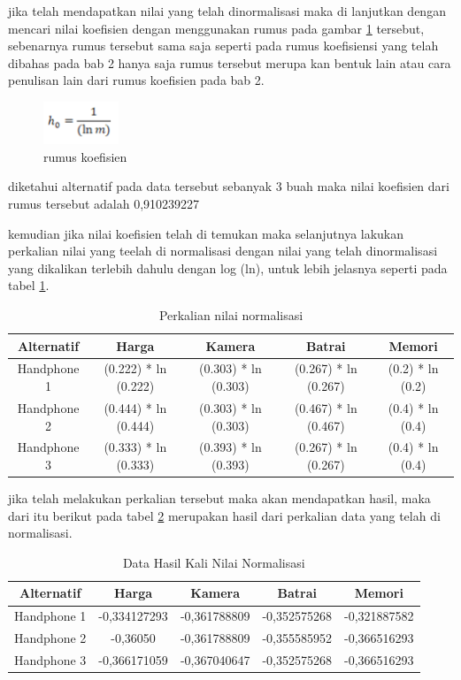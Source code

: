 jika telah mendapatkan nilai yang telah dinormalisasi maka di lanjutkan dengan mencari nilai koefisien dengan menggunakan rumus pada gambar \ref{rm1} tersebut, sebenarnya rumus tersebut sama saja seperti pada rumus koefisiensi yang telah dibahas pada bab 2 hanya saja rumus tersebut merupa kan bentuk lain atau cara penulisan lain dari rumus koefisien pada bab 2.

\begin{figure}[h]
	\centerline{\includegraphics[width=0.2\textwidth]{figures/rumus/5.png}}
	\caption{rumus koefisien}
	\label{rm1}
\end{figure}

diketahui alternatif pada data tersebut sebanyak 3 buah maka nilai koefisien dari rumus tersebut adalah 0,910239227\par
kemudian jika nilai koefisien telah di temukan maka selanjutnya lakukan perkalian nilai yang teelah di normalisasi dengan nilai yang telah dinormalisasi yang dikalikan terlebih dahulu dengan log (ln), untuk lebih jelasnya seperti pada tabel \ref{table8}.
\pagebreak
\begin{table}[h]
\caption{Perkalian nilai normalisasi}
\centering
\begin{tabular}{|c|c|c|c|c|}
\hline
Alternatif & Harga & Kamera & Batrai&Memori\\
\hline
Handphone 1 &(0.222) * ln (0.222) & (0.303) * ln (0.303) & (0.267) * ln (0.267) &  (0.2) * ln (0.2)\\
\hline
Handphone 2 &(0.444) * ln (0.444) & (0.303) * ln (0.303) & (0.467) * ln (0.467)  & (0.4) * ln (0.4)\\
\hline
Handphone 3 &(0.333) * ln (0.333) & (0.393) * ln (0.393) & (0.267) * ln (0.267) &  (0.4) * ln (0.4)\\
\hline

\end{tabular}
\label{table8}
\end{table}

jika telah melakukan perkalian tersebut maka akan mendapatkan hasil, maka dari itu berikut pada tabel \ref{table9} merupakan hasil dari perkalian data yang telah di normalisasi.
\begin{table}[h]
\caption{Data Hasil Kali Nilai Normalisasi}
\centering
\begin{tabular}{|c|c|c|c|c|}
\hline
Alternatif & Harga & Kamera & Batrai&Memori\\
\hline
Handphone 1 &-0,334127293 & -0,361788809 & -0,352575268 & -0,321887582\\
\hline
Handphone 2 &-0,36050 & -0,361788809 & -0,355585952 & -0,366516293\\
\hline
Handphone 3 &-0,366171059 & -0,367040647 & -0,352575268 & -0,366516293\\
\hline
\end{tabular}
\label{table9}
\end{table}


